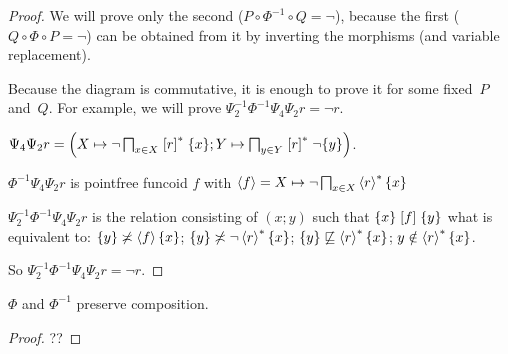 \begin{proof}
We will prove only the second ($P\circ \Phi^{-1}\circ Q = \lnot$), because the first ($Q\circ\Phi\circ P= \lnot$)
can be obtained from it by inverting the morphisms (and variable replacement).

Because the diagram is commutative, it is enough to prove it for some fixed~$P$ and~$Q$.
For example, we will prove $\Psi_2^{-1} \Phi^{-1} \Psi_4 \Psi_2 r = \neg r$.

$\Psi_4 \Psi_2 r = \left( X \mapsto \neg \bigsqcap_{x \in X} \mathrel{\left[r\right]^{\ast}}
\{ x \} ; Y \mapsto \bigsqcap_{y \in Y} \mathrel{\left[r\right]^{\ast}} \neg \{ y \} \right)$.

$\Phi^{-1} \Psi_4 \Psi_2 r$ is pointfree funcoid $f$ with $\left\langle f\right\rangle
= X \mapsto \neg \bigsqcap_{x \in X} \left\langle r\right\rangle ^{\ast} \{ x \}$

$\Psi_2^{-1} \Phi^{-1} \Psi_4 \Psi_2 r$ is the relation consisting of $(x ;
y)$ such that $\{ x \} \mathrel{\left[f\right]} \{ y \}$ what is equivalent to: $\{ y \}
\not\asymp \left\langle f\right\rangle \{ x \}$; $\{ y \} \not\asymp \neg \left\langle r\right\rangle ^{\ast} \{ x \}$; $\{ y \} \not\sqsubseteq \left\langle r\right\rangle ^{\ast} \{ x \}$; $y \notin \left\langle r\right\rangle ^{\ast} \{ x \}$.

So $\Psi_2^{-1} \Phi^{-1} \Psi_4 \Psi_2 r = \neg r$.
\end{proof}

\begin{prop}
$\Phi$ and $\Phi^{-1}$ preserve composition.
\end{prop}

\begin{proof}
??
\end{proof}